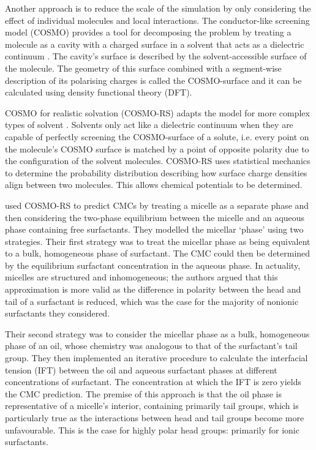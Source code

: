 Another approach is to reduce the scale of the simulation by only considering
the effect of individual molecules and local interactions. The conductor-like
screening model (COSMO) provides a tool for decomposing the problem by treating
a molecule as a cavity with a charged surface in a solvent that acts as a
dielectric continuum \cite{klamtCOSMONewApproach1993}. The cavity's surface is
described by the solvent-accessible surface of the molecule. The geometry of
this surface combined with a segment-wise description of its polarising charges
is called the COSMO-surface and it can be calculated using density functional
theory (DFT).

COSMO for realistic solvation (COSMO-RS) adapts the model for more complex types
of solvent \cite{klamtCOSMORSAlternativeSimulation2010}. Solvents only act like
a dielectric continuum when they are capable of perfectly screening the
COSMO-surface of a solute, i.e. every point on the molecule's COSMO surface is
matched by a point of opposite polarity due to the configuration of the solvent
molecules. COSMO-RS uses statistical mechanics to determine the probability
distribution describing how surface charge densities align between two
molecules. This allows chemical potentials to be determined.

\citet{turchiFirstprinciplesPredictionCritical2022} used COSMO-RS to predict
CMCs by treating a micelle as a separate phase and then considering the
two-phase equilibrium between the micelle and an aqueous phase containing free
surfactants. They modelled the micellar `phase' using two strategies. Their
first strategy was to treat the micellar phase as being equivalent to a bulk,
homogeneous phase of surfactant. The CMC could then be determined by the
equilibrium surfactant concentration in the aqueous phase. In actuality,
micelles are structured and inhomogeneous; the authors argued that this
approximation is more valid as the difference in polarity between the head and
tail of a surfactant is reduced, which was the case for the majority of nonionic
surfactants they considered.

Their second strategy was to consider the micellar phase as a bulk, homogeneous
phase of an oil, whose chemistry was analogous to that of the surfactant's tail
group. They then implemented an iterative procedure to calculate the interfacial
tension (IFT) between the oil and aqueous surfactant phases at different
concentrations of surfactant. The concentration at which the IFT is zero yields
the CMC prediction. The premise of this approach is that the oil phase is
representative of a micelle's interior, containing primarily tail groups, which
is particularly true as the interactions between head and tail groups become
more unfavourable. This is the case for highly polar head groups: primarily for
ionic surfactants.

